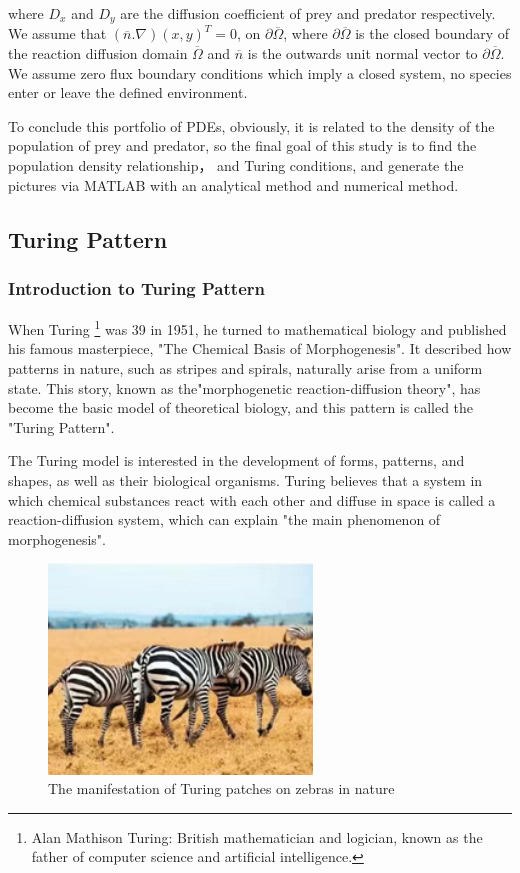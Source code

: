 \documentclass[12pt]{article}
\begin{document}
\noindent where $D_x$ and $D_y$ are the diffusion coefficient of prey and predator respectively. We assume that $(\overline{n}.\nabla)(x,y)^T=0$, on $\partial\overline\Omega$, where $\partial\overline\Omega$ is the closed boundary of the reaction diffusion domain $\overline\Omega$ and $\overline{n}$ is the outwards unit normal vector to $\partial\overline\Omega$. We assume zero flux boundary conditions which imply a closed system, no species enter or leave the defined environment.
\vspace{12pt}

\noindent To conclude this portfolio of PDEs, obviously, it is related to the density of the population of prey and predator, so the final goal of this study is to find the population density relationship， and Turing conditions, and generate the pictures via MATLAB with an analytical method and numerical method.

\vspace{24pt}

\subsection{Turing Pattern}
\subsubsection{Introduction to Turing Pattern}
\noindent When Turing \footnote{Alan Mathison Turing: British mathematician and logician, known as the father of computer science and artificial intelligence.} was 39 in 1951, he turned to mathematical biology and published his famous masterpiece, "The Chemical Basis of Morphogenesis". It described how patterns in nature, such as stripes and spirals, naturally arise from a uniform state. This story, known as the"morphogenetic reaction-diffusion theory", has become the basic model of theoretical biology, and this pattern is called the "Turing Pattern".

\vspace{24pt}

\noindent The Turing model is interested in the development of forms, patterns, and shapes, as well as their biological organisms. Turing believes that a system in which chemical substances react with each other and diffuse in space is called a reaction-diffusion system, which can explain "the main phenomenon of morphogenesis".
\vspace{12pt}
\begin{figure}[H]
\centering
\includegraphics[width=7cm]{zebra.png}
\caption{The manifestation of Turing patches on zebras in nature}
\label{fig:my_label}
\end{figure}
\end{document}
